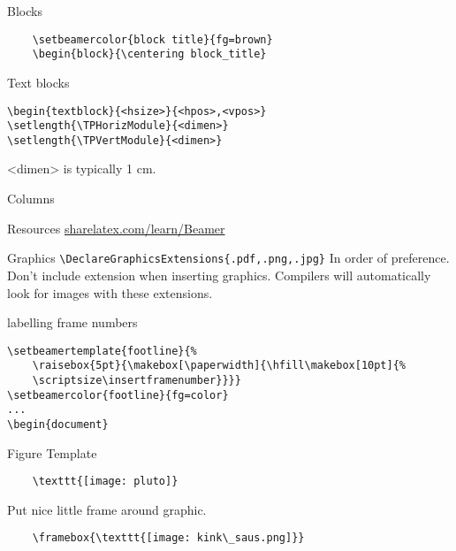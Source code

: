\documentclass[9pt]{beamer}
\begin{document}
\begin{frame}[fragile=singleslide]{Blocks}
    \begin{verbatim}
    \setbeamercolor{block title}{fg=brown}
    \begin{block}{\centering block_title}
    \end{verbatim}
    
\end{frame}%
\begin{frame}[fragile=singleslide]{Text blocks}
\begin{verbatim}
\begin{textblock}{<hsize>}{<hpos>,<vpos>}
\setlength{\TPHorizModule}{<dimen>}
\setlength{\TPVertModule}{<dimen>}
\end{verbatim}
<dimen> is typically 1 cm.
\end{frame}%
\begin{frame}[fragile=singleslide]{Columns}
\end{frame}%
\begin{frame}[fragile=singleslide]{Resources}
    \url{sharelatex.com/learn/Beamer}
\end{frame}%
\begin{frame}[fragile=singleslide]{Graphics}
    \verb|\DeclareGraphicsExtensions{.pdf,.png,.jpg}|
    In order of preference. Don't include extension when inserting
    graphics. Compilers will automatically look for images with these
    extensions.
\end{frame}%
\begin{frame}[fragile=singleslide]{labelling frame numbers}
    \begin{verbatim}
\setbeamertemplate{footline}{%
    \raisebox{5pt}{\makebox[\paperwidth]{\hfill\makebox[10pt]{%
    \scriptsize\insertframenumber}}}}
\setbeamercolor{footline}{fg=color}
...
\begin{document}
    \end{verbatim}
\end{frame}%
\begin{frame}[fragile=singleslide]{Figure Template}
    \begin{verbatim}
    \texttt{[image: pluto]}
    \end{verbatim}
    Put nice little frame around graphic.
    \begin{verbatim}
    \framebox{\texttt{[image: kink\_saus.png]}}
    \end{verbatim}
\end{frame}%
\end{document}
